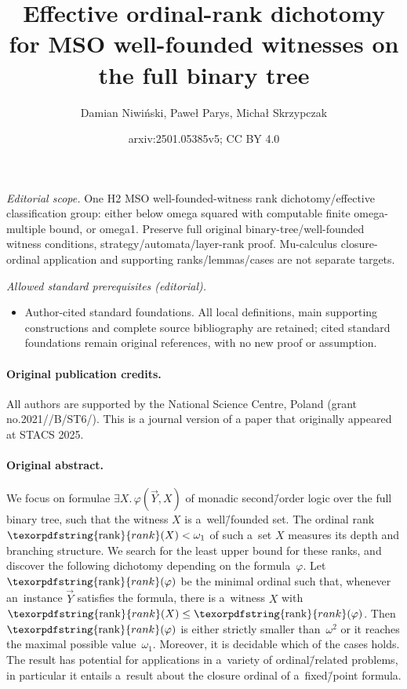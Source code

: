 \documentclass[11pt,a4paper]{amsart}
\title{Effective ordinal-rank dichotomy for MSO well-founded witnesses on the full binary tree}
\author{Damian Niwiński, Paweł Parys, Michał Skrzypczak}
\date{arxiv:2501.05385v5; CC BY 4.0}
\theoremstyle{plain}
\theoremstyle{definition}
\theoremstyle{defC}
\theoremstyle{thmC}
\theoremstyle{plain}
\numberwithin{equation}{section}
\numberwithin{equation}{section}
\numberwithin{figure}{section}
\newcommand{\ident}[1]{\ensuremath{\texorpdfstring{\mathrm{\mathnm{#1}}}{#1}}\xspace}
\newcommand{\mathnm}[1]{#1}
\newcommand{\rank}{\ident{rank}}
\begin{document}
\maketitle
\noindent\textit{Editorial scope.} One H2 MSO well-founded-witness rank dichotomy/effective classification group: either below omega squared with computable finite omega-multiple bound, or omega1. Preserve full original binary-tree/well-founded witness conditions, strategy/automata/layer-rank proof. Mu-calculus closure-ordinal application and supporting ranks/lemmas/cases are not separate targets.\par\medskip
\noindent\textit{Allowed standard prerequisites (editorial).}\begin{itemize}
\item Author-cited standard foundations. All local definitions, main supporting constructions and complete source bibliography are retained; cited standard foundations remain original references, with no new proof or assumption.
\end{itemize}\medskip
\paragraph{Original publication credits.} All authors are supported by the National Science Centre, Poland (grant no.\@ 2021//\allowbreak B/\allowbreak ST6/). This is a journal version of a paper that originally appeared at STACS 2025.
\paragraph{Original abstract.} 
	We focus on formulae $\exists X.\, \varphi(\vec{Y}, X)$ of monadic second\=/order logic over the full binary tree, such that the witness $X$ is a~well\=/founded set.
	The ordinal rank $\rank(X) < \omega_1$ of such a~set $X$ measures its depth and branching structure.
	We search for the least upper bound for these ranks, and discover the following dichotomy depending on the formula~$\varphi$.
	Let $\rank(\varphi)$ be the minimal ordinal such that, whenever an~instance $\vec{Y}$ satisfies the formula, there is a~witness $X$ with $\rank(X) \leq \rank(\varphi)$.
	Then $\rank(\varphi)$ is either strictly smaller than~$\omega^2$ or it reaches the maximal possible value~$\omega_1$.
	Moreover, it is decidable which of the cases holds.
	The result has potential for applications in a~variety of ordinal\=/related problems, in particular it entails a~result about the closure ordinal of a~fixed\=/point formula.
\end{document}

